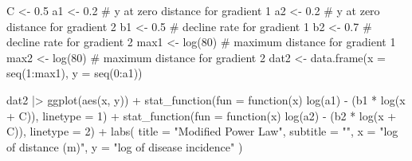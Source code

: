 \documentclass[
  letterpaper,
  DIV=11,
  numbers=noendperiod]{scrreprt}
\newenvironment{Shaded}{\begin{snugshade}}{\end{snugshade}}
\newcommand{\AttributeTok}[1]{\textcolor[rgb]{0.40,0.45,0.13}{#1}}
\newcommand{\CommentTok}[1]{\textcolor[rgb]{0.37,0.37,0.37}{#1}}
\newcommand{\ControlFlowTok}[1]{\textcolor[rgb]{0.00,0.23,0.31}{#1}}
\newcommand{\DecValTok}[1]{\textcolor[rgb]{0.68,0.00,0.00}{#1}}
\newcommand{\FloatTok}[1]{\textcolor[rgb]{0.68,0.00,0.00}{#1}}
\newcommand{\FunctionTok}[1]{\textcolor[rgb]{0.28,0.35,0.67}{#1}}
\newcommand{\NormalTok}[1]{\textcolor[rgb]{0.00,0.23,0.31}{#1}}
\newcommand{\OtherTok}[1]{\textcolor[rgb]{0.00,0.23,0.31}{#1}}
\newcommand{\SpecialCharTok}[1]{\textcolor[rgb]{0.37,0.37,0.37}{#1}}
\newcommand{\StringTok}[1]{\textcolor[rgb]{0.13,0.47,0.30}{#1}}
\begin{document}
\begin{Shaded}
\begin{Highlighting}[]
\NormalTok{C }\OtherTok{\textless{}{-}} \FloatTok{0.5}
\NormalTok{a1 }\OtherTok{\textless{}{-}} \FloatTok{0.2} \CommentTok{\# y at zero distance for gradient 1}
\NormalTok{a2 }\OtherTok{\textless{}{-}} \FloatTok{0.2} \CommentTok{\# y at zero distance for gradient 2}
\NormalTok{b1 }\OtherTok{\textless{}{-}} \FloatTok{0.5} \CommentTok{\# decline rate for gradient 1}
\NormalTok{b2 }\OtherTok{\textless{}{-}} \FloatTok{0.7} \CommentTok{\# decline rate for gradient 2}
\NormalTok{max1 }\OtherTok{\textless{}{-}} \FunctionTok{log}\NormalTok{(}\DecValTok{80}\NormalTok{) }\CommentTok{\# maximum distance for gradient 1}
\NormalTok{max2 }\OtherTok{\textless{}{-}} \FunctionTok{log}\NormalTok{(}\DecValTok{80}\NormalTok{) }\CommentTok{\# maximum distance for gradient 2}
\NormalTok{dat2 }\OtherTok{\textless{}{-}} \FunctionTok{data.frame}\NormalTok{(}\AttributeTok{x =} \FunctionTok{seq}\NormalTok{(}\DecValTok{1}\SpecialCharTok{:}\NormalTok{max1), }\AttributeTok{y =} \FunctionTok{seq}\NormalTok{(}\DecValTok{0}\SpecialCharTok{:}\NormalTok{a1))}

\NormalTok{dat2 }\SpecialCharTok{|\textgreater{}}
  \FunctionTok{ggplot}\NormalTok{(}\FunctionTok{aes}\NormalTok{(x, y)) }\SpecialCharTok{+}
  \FunctionTok{stat\_function}\NormalTok{(}\AttributeTok{fun =} \ControlFlowTok{function}\NormalTok{(x) }\FunctionTok{log}\NormalTok{(a1) }\SpecialCharTok{{-}}\NormalTok{ (b1 }\SpecialCharTok{*} \FunctionTok{log}\NormalTok{(x }\SpecialCharTok{+}\NormalTok{ C)), }\AttributeTok{linetype =} \DecValTok{1}\NormalTok{) }\SpecialCharTok{+}
  \FunctionTok{stat\_function}\NormalTok{(}\AttributeTok{fun =} \ControlFlowTok{function}\NormalTok{(x) }\FunctionTok{log}\NormalTok{(a2) }\SpecialCharTok{{-}}\NormalTok{ (b2 }\SpecialCharTok{*} \FunctionTok{log}\NormalTok{(x }\SpecialCharTok{+}\NormalTok{ C)), }\AttributeTok{linetype =} \DecValTok{2}\NormalTok{) }\SpecialCharTok{+}
  \FunctionTok{labs}\NormalTok{(}
    \AttributeTok{title =} \StringTok{"Modified Power Law"}\NormalTok{,}
    \AttributeTok{subtitle =} \StringTok{""}\NormalTok{,}
    \AttributeTok{x =} \StringTok{"log of distance (m)"}\NormalTok{,}
    \AttributeTok{y =} \StringTok{"log of disease incidence"}
\NormalTok{  )}
\end{Highlighting}
\end{Shaded}
\end{document}

